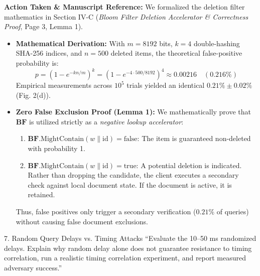 \documentclass[11pt,a4paper]{article}
\begin{document}
\begin{responsebox}
\textbf{Action Taken \& Manuscript Reference:} We formalized the deletion filter mathematics in Section IV-C (\emph{Bloom Filter Deletion Accelerator \& Correctness Proof}, Page 3, Lemma 1).

\begin{itemize}[itemsep=2pt]
    \item \textbf{Mathematical Derivation:} With $m = 8192$ bits, $k = 4$ double-hashing SHA-256 indices, and $n = 500$ deleted items, the theoretical false-positive probability is:
    \begin{equation}
    p = \left(1 - e^{-k n / m}\right)^k = \left(1 - e^{-4 \cdot 500 / 8192}\right)^4 \approx 0.00216 \quad (0.216\%)
    \end{equation}
    Empirical measurements across $10^5$ trials yielded an identical $0.21\% \pm 0.02\%$ (Fig. 2(d)).
    \item \textbf{Zero False Exclusion Proof (Lemma 1):} We mathematically prove that $\mathbf{BF}$ is utilized strictly as a \emph{negative lookup accelerator}:
    \begin{enumerate}[itemsep=1pt]
        \item $\mathbf{BF}.\text{MightContain}(w \parallel \text{id}) = \text{false}$: The item is guaranteed non-deleted with probability 1.
        \item $\mathbf{BF}.\text{MightContain}(w \parallel \text{id}) = \text{true}$: A potential deletion is indicated. Rather than dropping the candidate, the client executes a secondary check against local document state. If the document is active, it is retained.
    \end{enumerate}
    Thus, false positives only trigger a secondary verification ($0.21\%$ of queries) without causing false document exclusions.
\end{itemize}
\end{responsebox}

\vspace{1em}

\begin{reviewbox}{7. Random Query Delays vs. Timing Attacks}
``Evaluate the 10--50 ms randomized delays. Explain why random delay alone does not guarantee resistance to timing correlation, run a realistic timing correlation experiment, and report measured adversary success.''
\end{reviewbox}
\end{document}
